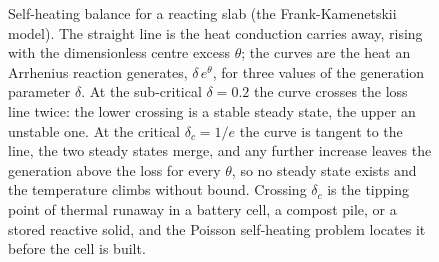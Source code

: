 \begin{figure}[htbp]
\centering
{}
\caption[Thermal-runaway balance]{Self-heating balance for a
reacting slab (the Frank-Kamenetskii model). The straight line is
the heat conduction carries away, rising with the dimensionless
centre excess $\theta$; the curves are the heat an Arrhenius reaction
generates, $\delta\, e^{\theta}$, for three values of the generation
parameter $\delta$. At the sub-critical $\delta = 0.2$ the curve
crosses the loss line twice: the lower crossing is a stable steady
state, the upper an unstable one. At the critical $\delta_c = 1/e$
the curve is tangent to the line, the two steady states merge, and
any further increase leaves the generation above the loss for every
$\theta$, so no steady state exists and the temperature climbs
without bound. Crossing $\delta_c$ is the tipping point of thermal
runaway in a battery cell, a compost pile, or a stored reactive
solid, and the Poisson self-heating problem locates it before the
cell is built.}
\label{fig:vol02:ch12:runaway}
\end{figure}
